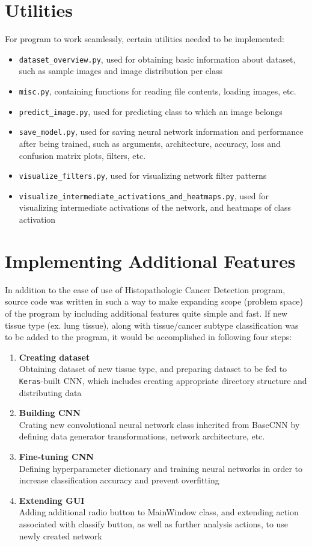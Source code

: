 \section{Utilities}
\label{utils}

For program to work seamlessly, certain utilities needed to be implemented:
\begin{itemize}
	\itemsep 0em
	\item \texttt{dataset\_overview.py}, used for obtaining basic information about dataset, such as sample images and image distribution per class
	\item \texttt{misc.py}, containing functions for reading file contents, loading images, etc. 
	\item \texttt{predict\_image.py}, used for predicting class to which an image belongs
	\item \texttt{save\_model.py}, used for saving neural network information and performance after being trained, such as arguments, architecture, accuracy, loss and confusion matrix plots, filters, etc.  
	\item \texttt{visualize\_filters.py}, used for visualizing network filter patterns
	\item \texttt{visualize\_intermediate\_activations\_and\_heatmaps.py}, used for visualizing intermediate activations of the network, and heatmaps of class activation
\end{itemize}

\section{Implementing Additional Features}

In addition to the ease of use of Histopathologic Cancer Detection program, source code was written in such a way to make expanding scope (problem space) of the program by including additional features quite simple and fast. If new tissue type (ex. lung tissue), along with tissue/cancer subtype classification was to be added to the program, it would be accomplished in following four steps:
\begin{enumerate}
	\itemsep 0em
	\item \textbf{Creating dataset} \\
	Obtaining dataset of new tissue type, and preparing dataset to be fed to \texttt{Keras}-built CNN, which includes creating appropriate directory structure and distributing data
	\item \textbf{Building CNN} \\
	Crating new convolutional neural network class inherited from BaseCNN by defining data generator transformations, network architecture, etc.
	\item \textbf{Fine-tuning CNN} \\
	Defining hyperparameter dictionary and training neural networks in order to increase classification accuracy and prevent overfitting
	\item \textbf{Extending GUI} \\
	Adding additional radio button to MainWindow class, and extending action associated with classify button, as well as further analysis actions, to use newly created network
\end{enumerate}

